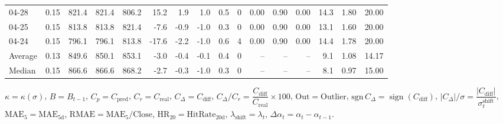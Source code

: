 \begin{threeparttable}
{\begin{tabular}{lrrrrrrrrrrrrrrr}
  04-28 &     0.15 & 821.4 & 821.4 & 806.2 &       15.2 &            1.9 &                      1.0 &                 0.5 &              0 &       0.00 &      0.90 &           0.00 &             14.3 &            1.80 &                  20.00 \\
  04-25 &     0.15 & 813.8 & 813.8 & 821.4 &       -7.6 &           -0.9 &                     -1.0 &                 0.3 &              0 &       0.00 &      0.90 &           0.00 &             13.1 &            1.60 &                  20.00 \\
  04-24 &     0.15 & 796.1 & 796.1 & 813.8 &      -17.6 &           -2.2 &                     -1.0 &                 0.6 &              4 &       0.00 &      0.90 &           0.00 &             14.4 &            1.78 &                  20.00 \\
Average &     0.13 & 849.6 & 850.1 & 853.1 &       -3.0 &           -0.4 &                     -0.1 &                 0.4 &              0 &         -- &        -- &             -- &              9.1 &            1.08 &                  14.17 \\
 Median &     0.15 & 866.6 & 866.6 & 868.2 &       -2.7 &           -0.3 &                     -1.0 &                 0.3 &              0 &         -- &        -- &             -- &              8.1 &            0.97 &                  15.00 \\
\bottomrule
\end{tabular}
}
\begin{tablenotes}\footnotesize
\item $\kappa=\kappa(\sigma)$, $B=B_{t-1}$, $C_p=C_{\text{pred}}$, $C_r=C_{\text{real}}$, $C_\Delta=C_{\text{diff}}$, $C_\Delta/C_r=\dfrac{C_{\text{diff}}}{C_{\text{real}}}\times100$, $\mathrm{Out}=\text{Outlier}$, $\mathrm{sgn}\,C_\Delta=\operatorname{sign}(C_{\text{diff}})$, $|C_\Delta|/\sigma=\dfrac{|C_{\text{diff}}|}{\sigma_t^{\text{shift}}}$, $\mathrm{MAE}_5=\mathrm{MAE}_{5\text{d}}$, $\mathrm{RMAE}= \mathrm{MAE}_5 / \text{Close}$, $\mathrm{HR}_{20}=\mathrm{HitRate}_{20\text{d}}$, 
$\lambda_{\text{shift}}=\lambda_t$, 
$\Delta\alpha_t=\alpha_t-\alpha_{t-1}$.
\end{tablenotes}
\end{threeparttable}
\endgroup

